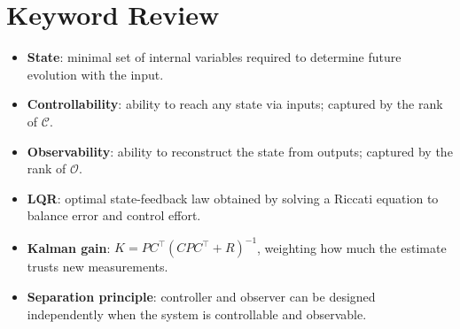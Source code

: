 \section{Keyword Review}
\begin{vocabulary}
\begin{itemize}[leftmargin=*]
    \item \textbf{State}: minimal set of internal variables required to determine future evolution with the input.
    \item \textbf{Controllability}: ability to reach any state via inputs; captured by the rank of $\mathcal{C}$.
    \item \textbf{Observability}: ability to reconstruct the state from outputs; captured by the rank of $\mathcal{O}$.
    \item \textbf{LQR}: optimal state-feedback law obtained by solving a Riccati equation to balance error and control effort.
    \item \textbf{Kalman gain}: $K = P C^\top (C P C^\top + R)^{-1}$, weighting how much the estimate trusts new measurements.
    \item \textbf{Separation principle}: controller and observer can be designed independently when the system is controllable and observable.
\end{itemize}
\end{vocabulary}
